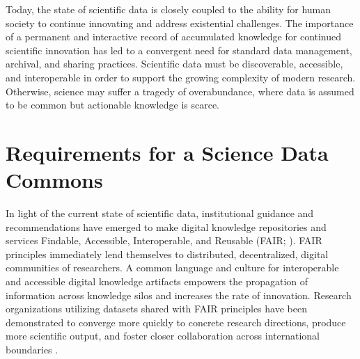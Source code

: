 \documentclass[conference]{IEEEtran}
\begin{document}

Today, the state of scientific data is closely coupled to the ability for human society to continue innovating and address existential challenges. The importance of a permanent and interactive record of accumulated knowledge for continued scientific innovation has led to a convergent need for standard data management, archival, and sharing practices. Scientific data must be discoverable, accessible, and interoperable in order to support the growing complexity of modern research. Otherwise, science may suffer a tragedy of overabundance, where data is assumed to be common but actionable knowledge is scarce.

\section{Requirements for a Science Data Commons}
In light of the current state of scientific data, institutional guidance and recommendations have emerged to make digital knowledge repositories and services Findable, Accessible, Interoperable, and Reusable (FAIR; \cite{Wilkinson2016}). FAIR principles immediately lend themselves to distributed, decentralized, digital communities of researchers. A common language and culture for interoperable and accessible digital knowledge artifacts empowers the propagation of information across knowledge silos and increases the rate of innovation. Research organizations utilizing datasets shared with FAIR principles have been demonstrated to converge more quickly to concrete research directions, produce more scientific output, and foster closer collaboration across international boundaries \cite{wise2019implementation, boeckhout2018fair}. 
\end{document}
